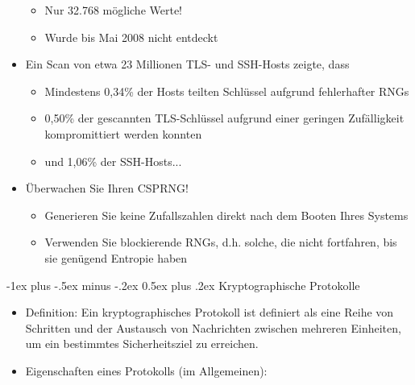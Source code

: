 \documentclass[a4paper]{article}
\makeatletter
\renewcommand{\section}{\@startsection{section}{1}{0mm}%
 {-1ex plus -.5ex minus -.2ex}%
 {0.5ex plus .2ex}%
 {\normalfont\large\bfseries}}
\makeatother
\begin{document}
\begin{multicols}{3}
\begin{itemize}
              \begin{itemize}
                  \item
                        Nur 32.768 mögliche Werte!
                  \item
                        Wurde bis Mai 2008 nicht entdeckt
              \end{itemize}
        \item
              Ein Scan von etwa 23 Millionen TLS- und SSH-Hosts zeigte, dass

              \begin{itemize}
                  \item
                        Mindestens 0,34\% der Hosts teilten Schlüssel aufgrund fehlerhafter
                        RNGs
                  \item
                        0,50\% der gescannten TLS-Schlüssel aufgrund einer geringen
                        Zufälligkeit kompromittiert werden konnten
                  \item
                        und 1,06\% der SSH-Hosts...
              \end{itemize}
        \item
              Überwachen Sie Ihren CSPRNG!

              \begin{itemize}
                  \item
                        Generieren Sie keine Zufallszahlen direkt nach dem Booten Ihres
                        Systems
                  \item
                        Verwenden Sie blockierende RNGs, d.h. solche, die nicht fortfahren,
                        bis sie genügend Entropie haben
              \end{itemize}
    \end{itemize}


    \section{Kryptographische
      Protokolle}

    \begin{itemize}
        \item
              Definition: Ein kryptographisches Protokoll ist definiert als eine
              Reihe von Schritten und der Austausch von Nachrichten zwischen
              mehreren Einheiten, um ein bestimmtes Sicherheitsziel zu erreichen.
        \item
              Eigenschaften eines Protokolls (im Allgemeinen):


\end{itemize}
\end{multicols}
\end{document}
